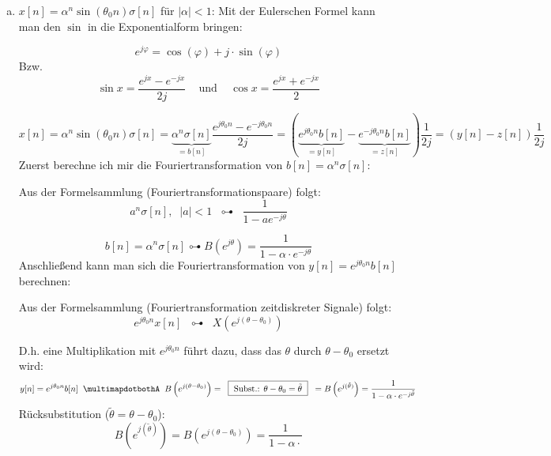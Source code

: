 \begin{uebsp}
\begin{Answer}
\begin{enumerate}[a)]
        \item $\displaystyle x[n]=\alpha^n \sin\left(\theta_0n\right)\sigma[n]$ für
            $|\alpha|<1$:
            Mit der Eulerschen Formel kann man den $\sin$ in die Exponentialform
            bringen:
            \begin{definition}
                \[e^{j\varphi}=\cos(\varphi)+j\cdot\sin(\varphi)\]
                Bzw. 
                \[\sin x = \frac{e^{jx} - e^{-jx}}{2j}\;\;\;\text{ und
                    }\;\;\;\cos x = \frac{e^{jx} + e^{-jx}}{2}\]
            \end{definition}
            \[x[n]=\alpha^n\sin\left(\theta_0n\right)\sigma[n]
            =\underbrace{\alpha^n\sigma[n]}_{=b[n]}\frac{e^{j\theta_0n} - e^{-j\theta_0n}}{2j}
            =\left(\underbrace{e^{j\theta_0n}b[n]}_{=y[n]} -
                \underbrace{e^{-j\theta_0n}b[n]}_{=z[n]}\right)
            \frac{1}{2j}=\left(y[n]-z[n]\right)\frac{1}{2j}\]
            Zuerst berechne ich mir die Fouriertransformation von
            $b[n]=\alpha^n\sigma[n]$:
            \begin{uebsp_theory}
                Aus der Formelsammlung (Fouriertransformationspaare) folgt:
                \[a^n\sigma[n],\;\;|a|<1\;\;\multimapdotbothA\;\;\frac{1}{1-ae^{-j\theta}}\]
            \end{uebsp_theory}
            \[b[n]=\alpha^n\sigma[n]\multimapdotbothA
            B\left(e^{j\theta}\right)=\frac{1}{1-\alpha\cdot e^{-j\theta}}\]
            Anschließend kann man sich die Fouriertransformation von
            $y[n]=e^{j\theta_0n}b[n]$ berechnen:
            \begin{uebsp_theory}
                Aus der Formelsammlung (Fouriertransformation zeitdiskreter
                Signale) folgt:
                \[e^{j\theta_0n}x[n]\;\;\multimapdotbothA\;\;X\left(e^{j(\theta-\theta_0)}\right)\]
            \end{uebsp_theory}
            D.h. eine Multiplikation mit $e^{j\theta_0n}$ führt dazu, dass
            das $\theta$ durch $\theta-\theta_0$ ersetzt wird:
            \[y[n]=e^{j\theta_0n}b[n]\;\;\multimapdotbothA\;\;B\left(e^{j(\theta-\theta_0)}\right)=
                \;\;\fbox{ Subst.: $\theta-\theta_0=\tilde\theta$ }\;\;
                =B\left(e^{j(\tilde\theta)}\right)=\frac{1}{1-\alpha\cdot
                    e^{-j\tilde\theta}}\]
                    Rücksubstitution ($\tilde\theta=\theta-\theta_0$):
            \[B\left(e^{j(\tilde\theta)}\right)=B\left(e^{j(\theta-\theta_0)}\right)=\frac{1}{1-\alpha\cdot
}\]
\end{enumerate}
\end{Answer}
\end{uebsp}
